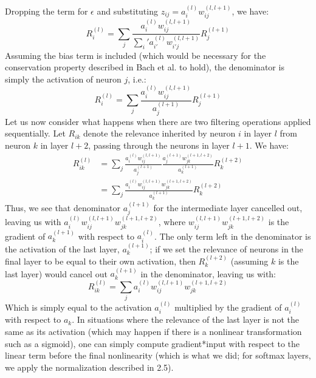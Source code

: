 \documentclass{article}
\begin{document}
Dropping the term for $\epsilon$ and substituting $z_{ij} = a_i^{(l)} w_{ij}^{(l,l+1)}$, we have:
\begin{equation}
R_i^(l) = \sum_j \frac{a_i^{(l)} w_{ij}^{(l,l+1)}}{\sum_i' a_{i'}^{(l)} w_{i'j}^{(l,l+1)}} R_j^{(l+1)}
\end{equation}
Assuming the bias term is included (which would be necessary for the conservation property described in Bach et al. to hold), the denominator is simply the activation of neuron $j$, i.e.:
\begin{equation}
R_i^(l) = \sum_j \frac{a_i^{(l)} w_{ij}^{(l,l+1)}}{a_j^{(l+1)}} R_j^{(l+1)}
\end{equation}
Let us now consider what happens when there are two filtering operations applied sequentially. Let $R_{ik}$ denote the relevance inherited by neuron $i$ in layer $l$ from neuron $k$ in layer $l+2$, passing through the neurons in layer $l+1$. We have:
\begin{equation}
\begin{aligned}
R_{ik}^{(l)} &= \sum_j \frac{a_i^{(l)} w_{ij}^{(l,l+1)}}{a_j^{(l+1)}} \frac{a_j^{(l+1)} w_{jk}^{(l+1,l+2)}}{a_k^{(l+1)}} R_{k}^{(l+2)}\\
              &= \sum_j  \frac{a_i^{(l)} w_{ij}^{(l,l+1)} w_{jk}^{(l+1,l+2)}}{a_k^{(l+1)}} R_{k}^{(l+2)}
\end{aligned}
\end{equation}
Thus, we see that denominator $a_j^{(l+1)}$ for the intermediate layer cancelled out, leaving us with $a_i^{(l)} w_{ij}^{(l,l+1)}w_{jk}^{(l+1,l+2)}$, where $w_{ij}^{(l,l+1)} w_{jk}^{(l+1,l+2)}$ is the gradient of $a_k^{(l+1)}$ with respect to $a_i^{(l)}$. The only term left in the denominator is the activation of the last layer, $a_k^{(l+1)}$; if we set the relevance of neurons in the final layer to be equal to their own activation, then $R_{k}^{(l+2)}$ (assuming $k$ is the last layer) would cancel out $a_k^{(l+1)}$ in the denominator, leaving us with:
\begin{equation}
R_{ik}^{(l)} =  \sum_j  a_i^{(l)} w_{ij}^{(l,l+1)}w_{jk}^{(l+1,l+2)}
\end{equation}
Which is simply equal to the activation $a_i^{(l)}$ multiplied by the gradient of $a_i^{(l)}$ with respect to $a_k$. In situations where the relevance of the last layer is not the same as its activation (which may happen if there is a nonlinear transformation such as a sigmoid), one can simply compute gradient*input with respect to the linear term before the final nonlinearity (which is what we did; for softmax layers, we apply the normalization described in 2.5).
\end{document}
